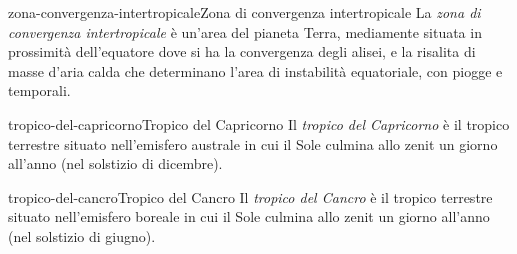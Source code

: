 \documentclass[preview]{standalone}
\begin{document}
\begin{snippetdefinition}{zona-convergenza-intertropicale}{Zona di convergenza intertropicale}
    La \textit{zona di convergenza intertropicale} è un'area del pianeta Terra, mediamente situata in prossimità dell'equatore
    dove si ha la convergenza degli alisei, e la risalita di masse d'aria calda che determinano l'area di instabilità equatoriale, con piogge e temporali.
\end{snippetdefinition}




\begin{snippetdefinition}{tropico-del-capricorno}{Tropico del Capricorno}
    Il \textit{tropico del Capricorno} è il tropico terrestre
    situato nell'emisfero australe in cui il Sole
    culmina allo zenit un giorno all'anno (nel solstizio di dicembre).
\end{snippetdefinition}

\begin{snippetdefinition}{tropico-del-cancro}{Tropico del Cancro}
    Il \textit{tropico del Cancro} è il tropico terrestre
    situato nell'emisfero boreale in cui il Sole culmina
    allo zenit un giorno all'anno (nel solstizio di giugno).
\end{snippetdefinition}

\end{document}

